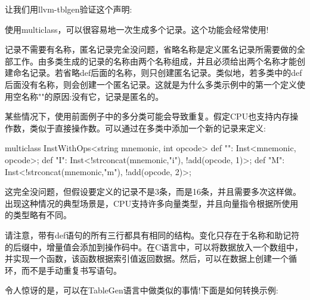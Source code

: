 让我们用llvm-tblgen验证这个声明:


使用multiclass，可以很容易地一次生成多个记录。这个功能会经常使用!

记录不需要有名称，匿名记录完全没问题，省略名称是定义匿名记录所需要做的全部工作。由多类生成的记录的名称由两个名称组成，并且必须给出两个名称才能创建命名记录。若省略def后面的名称，则只创建匿名记录。类似地，若多类中的def后面没有名称，则会创建一个匿名记录。这就是为什么多类示例中的第一个定义使用空名称""的原因:没有它，记录是匿名的。


某些情况下，使用前面例子中的多分类可能会导致重复。假定CPU也支持内存操作数，类似于直接操作数。可以通过在多类中添加一个新的记录来定义:

\begin{shell}
multiclass InstWithOps<string mnemonic, int opcode> {
    def "": Inst<mnemonic, opcode>;
    def "I": Inst<!strconcat(mnemonic,"i"), !add(opcode, 1)>;
    def "M": Inst<!strconcat(mnemonic,"m"), !add(opcode, 2)>;
}
\end{shell}

这完全没问题，但假设要定义的记录不是3条，而是16条，并且需要多次这样做。出现这种情况的典型场景是，CPU支持许多向量类型，并且向量指令根据所使用的类型略有不同。

请注意，带有def语句的所有三行都具有相同的结构。变化只存在于名称和助记符的后缀中，增量值会添加到操作码中。在C语言中，可以将数据放入一个数组中，并实现一个函数，该函数根据索引值返回数据。然后，可以在数据上创建一个循环，而不是手动重复书写语句。

令人惊讶的是，可以在TableGen语言中做类似的事情!下面是如何转换示例:

